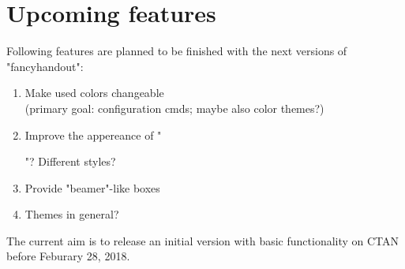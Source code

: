 \documentclass[11pt]{ltxdoc}
\begin{document}
	\section{Upcoming features}
	Following features are planned to be finished with the next versions of "fancyhandout":
	\begin{enumerate}
		\item
			Make used colors changeable \\ (primary goal: configuration cmds; maybe also color themes?)
		
		\item
			Improve the appereance of "\maketitle"? Different styles?
		
		\item
			Provide "beamer"-like boxes
		
		\item
			Themes in general?
	\end{enumerate}
	
	The current aim is to release an initial version with basic functionality on CTAN before Feburary 28, 2018.
\end{document}
